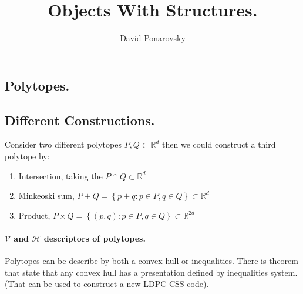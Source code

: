 \documentclass{article}
\newcommand{\expp}[1]{ \mathbf{E} \left[ {#1} \right]}
\begin{document}
\newcommand{\dalg}[1]{\expp{#1 : \text{alg} \sim \tilde{\text{alg}}}}
\newcommand{\dsig}[1]{\expp{#1 : \sigma \sim \tilde{\sigma}}}
\newcommand{\calg}{c_{\text{alg}}}
\newcommand{\cbase}{c_{\text{base}}}



\title{ Objects With Structures. } 
\author{David Ponarovsky}
\maketitle
\tableofcontents


\begin{multicols*}{2}

  \section{Polytopes.} 
  

  \subsection{Different Constructions.} 
  Consider two different polytopes $P,Q \subset \mathbb{R}^{d}$ then we could construct a third polytope by: 
  \begin{enumerate}
    \item Intersection, taking the $P\cap Q \subset \mathbb{R}^{d}$
    \item Minkeoski sum, $P+Q = \left\{ p + q : p \in P, q \in Q \right\} \subset \mathbb{R}^{d}$
    \item Product, $P \times  Q = \left\{ \left( p,q \right):  p \in P, q \in Q \right\} \subset \mathbb{R}^{2d}$
  \end{enumerate}

  \paragraph{ $\mathcal{V}$ and $\mathcal{H}$ descriptors of polytopes.} Polytopes can be describe by both a convex hull or inequalities. There is theorem that state that any convex hull has a presentation defined by inequalities system.
  (That can be used to construct a new LDPC CSS code).  
  

\end{multicols*}
\end{document}
